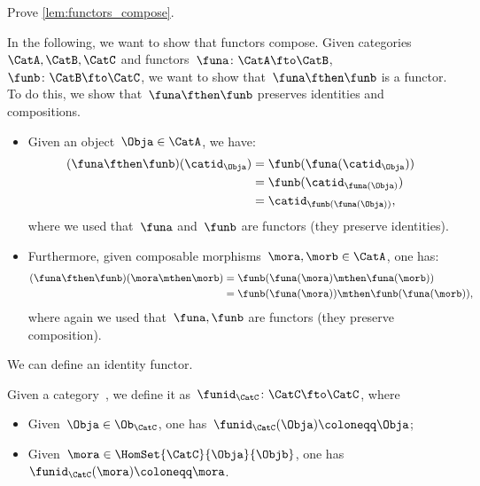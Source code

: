 \begin{exercise}
    Prove \cref{lem:functors_compose}.
\end{exercise}
\begin{solution}
    In the following, we want to show that functors compose.
    Given categories~$\CatA,\CatB,\CatC$ and functors~$\funa\colon \CatA\fto \CatB$,~$\funb \colon \CatB\fto \CatC$, we want to show that~$\funa\fthen\funb$ is a functor.
    To do this, we show that~$\funa\fthen\funb$ preserves identities and compositions.
    \begin{itemize}
        \item Given an object~$\Obja\in \CatA$, we have:
              \begin{equation*}
                  \begin{aligned}
                      (\funa\fthen\funb)(\catid_\Obja)
                       & =\funb(\funa(\catid_\Obja))    \\
                       & =\funb(\catid_{\funa(\Obja)})  \\
                       & =\catid_{\funb(\funa(\Obja))},
                  \end{aligned}
              \end{equation*}
              where we used that~$\funa$ and~$\funb$ are functors (they preserve identities).
        \item Furthermore, given composable morphisms~$\mora,\morb\in \CatA$, one has:
              \begin{equation*}
                  \begin{aligned}
                      (\funa\fthen\funb)(\mora\mthen\morb)
                       & =\funb(\funa(\mora)\mthen \funa(\morb))         \\
                       & =\funb(\funa(\mora))\mthen \funb(\funa(\morb)),
                  \end{aligned}
              \end{equation*}
              where again we used that~$\funa,\funb$ are functors (they preserve composition).
    \end{itemize}
\end{solution}

We can define an identity functor.

\begin{ctdefinition}
    \label{def:identity_functor}
    Given a category~\CatC, we define it as~$\funid_\CatC\colon \CatC \fto \CatC$, where
    \begin{itemize}
        \item Given~$\Obja\in \Ob_\CatC$, one has~$\funid_\CatC(\Obja)\coloneqq \Obja$;
        \item Given~$\mora \in \HomSet{\CatC}{\Obja}{\Objb}$, one has~$\funid_\CatC(\mora)\coloneqq \mora$.
    \end{itemize}
\end{ctdefinition}

